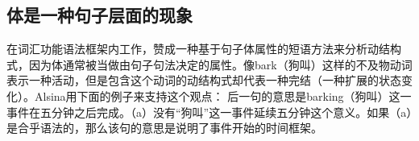 \subsection{体是一种句子层面的现象}
\label{sec-aspect-at-clause-level}

     \citet{Alsina96a}在词汇功能语法\indexlfg 框架内工作，赞成一种基于句子体属性的短语方法来分析动结构式，因为体通常被当做由句子句法决定的属性。像bark（狗叫）这样的不及物动词表示一种活动，但是包含这个动词的动结构式却代表一种完结（一种扩展的状态变化）。Alsina用下面的例子来支持这个观点：
\eal
\judgewidth{(*)}
\zl
后一句的意思是barking（狗叫）这一事件在五分钟之后完成。（a）没有“狗叫”这一事件延续五分钟这个意义。如果（a）是合乎语法的，那么该句的意思是说明了事件开始的时间框架。


